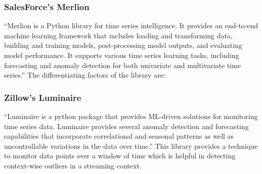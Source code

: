 \subsubsection{SalesForce's Merlion}
\enquote{Merlion is a Python library for time series intelligence. It provides an end-to-end machine learning framework that includes loading and transforming data, building and training models, post-processing model outputs, and evaluating model performance. It supports various time series learning tasks, including forecasting and anomaly detection for both univariate and multivariate time series.} 
The differentiating factors of the library are:

\subsubsection{Zillow's Luminaire}

\enquote{Luminaire is a python package that provides ML-driven solutions for monitoring time series data. Luminaire provides several anomaly detection and forecasting capabilities that incorporate correlational and seasonal patterns as well as uncontrollable variations in the data over time.} This library provides a technique to monitor data points over a window of time which is helpful in detecting context-wise outliers in a streaming context.

